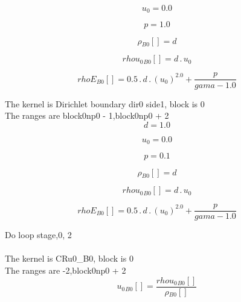\documentclass{article}
\begin{document}
\begin{dmath}u_{0} = 0.0\end{dmath}

\begin{dmath}p = 1.0\end{dmath}

\begin{dmath}{\rho{_{B0}}}[{}] = d\end{dmath}

\begin{dmath}{rhou_{0}{_{B0}}}[{}] = d \,.\, u_{0}\end{dmath}

\begin{dmath}{rhoE{_{B0}}}[{}] = 0.5 \,.\, d \,.\, \left(u_{0} \right)^{2.0} + \frac{p}{gama - 1.0}\end{dmath}

\noindent The kernel is Dirichlet boundary dir0 side1, block is 0\\\noindent The ranges are block0np0 - 1,block0np0 + 2\\\begin{dmath}d = 1.0\end{dmath}

\begin{dmath}u_{0} = 0.0\end{dmath}

\begin{dmath}p = 0.1\end{dmath}

\begin{dmath}{\rho{_{B0}}}[{}] = d\end{dmath}

\begin{dmath}{rhou_{0}{_{B0}}}[{}] = d \,.\, u_{0}\end{dmath}

\begin{dmath}{rhoE{_{B0}}}[{}] = 0.5 \,.\, d \,.\, \left(u_{0} \right)^{2.0} + \frac{p}{gama - 1.0}\end{dmath}

\noindent Do loop stage,0, 2\\
\\\noindent The kernel is CRu0_B0, block is 0\\\noindent The ranges are -2,block0np0 + 2\\\begin{dmath}{u_{0}{_{B0}}}[{}] = \frac{{rhou_{0}{_{B0}}}[{}]}{{\rho{_{B0}}}[{}]}\end{dmath}
\end{document}
